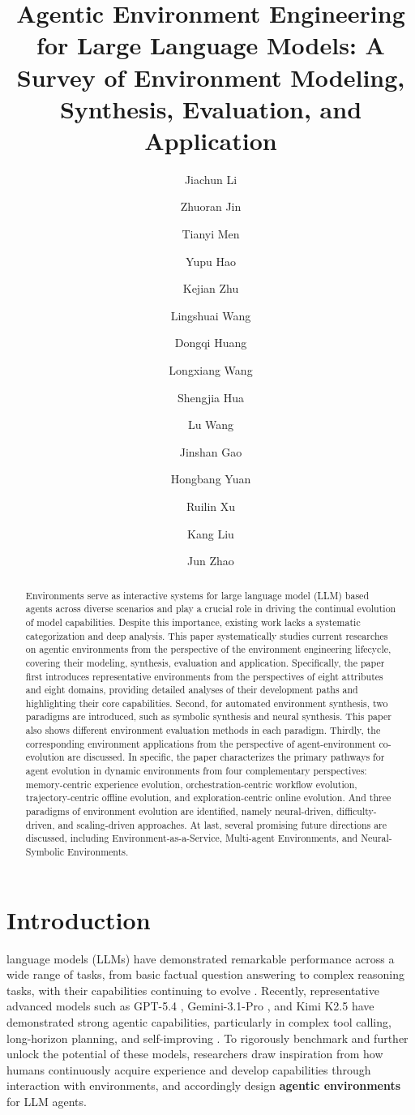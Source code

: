 \documentclass{llmxive}
\title{Agentic Environment Engineering for Large Language Models: A Survey of Environment Modeling, Synthesis, Evaluation, and Application}
\author{Jiachun Li \and Zhuoran Jin \and Tianyi Men \and Yupu Hao \and Kejian Zhu \and Lingshuai Wang \and Dongqi Huang \and Longxiang Wang \and Shengjia Hua \and Lu Wang \and Jinshan Gao \and Hongbang Yuan \and Ruilin Xu \and Kang Liu \and Jun Zhao}
\begin{document}
\maketitle
\begin{abstract}
Environments serve as interactive systems for large language model (LLM) based agents across diverse scenarios and play a crucial role in driving the continual evolution of model capabilities. Despite this importance, existing work lacks a systematic categorization and deep analysis. This paper systematically studies current researches on agentic environments from the perspective of the environment engineering lifecycle, covering their modeling, synthesis, evaluation and application. Specifically, the paper first introduces representative environments from the perspectives of eight attributes and eight domains, providing detailed analyses of their development paths and highlighting their core capabilities.
Second, for automated environment synthesis, two paradigms are introduced, such as symbolic synthesis and neural synthesis. This paper also shows different environment evaluation methods in each paradigm. Thirdly, the corresponding environment applications from the perspective of agent-environment co-evolution are discussed. 
In specific, the paper characterizes the primary pathways for agent evolution in dynamic environments from four complementary perspectives: memory-centric experience evolution, orchestration-centric workflow evolution, trajectory-centric offline evolution, and exploration-centric online evolution.
And three paradigms of environment evolution are identified, namely neural-driven, difficulty-driven, and scaling-driven approaches. At last, several promising future directions are discussed, including Environment-as-a-Service, Multi-agent Environments, and Neural-Symbolic Environments.
\end{abstract}
\section{Introduction}
\label{sec:introduction}







 language models (LLMs) have demonstrated remarkable performance across a wide range of tasks, from basic factual question answering to complex reasoning tasks, with their capabilities continuing to evolve \cite{Qwen3,DeepSeek-R1,GEM,HLE}. Recently, representative advanced models such as GPT-5.4 \cite{gpt-5.4}, Gemini-3.1-Pro \cite{gemini3.1}, and Kimi K2.5 \cite{Kimi_K2.5} have demonstrated strong agentic capabilities, particularly in complex tool calling, long-horizon planning, and self-improving \cite{ToolRL, TravelPlanner, Self-Refine}. To rigorously benchmark and further unlock the potential of these models, researchers draw inspiration from how humans continuously acquire experience and develop capabilities through interaction with environments, and accordingly design \textbf{agentic environments} for LLM agents.
\end{document}
